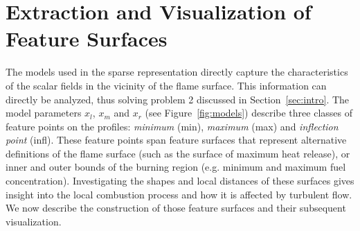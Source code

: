
%
\section{Extraction and Visualization of Feature Surfaces}
\label{sec:visualization}
%
The models used in the sparse representation directly capture the
characteristics of the scalar fields in the vicinity of the flame surface. This
information can directly be analyzed, thus solving problem 2 discussed in
Section~\ref{sec:intro}. The model parameters $x_l$, $x_m$ and $x_r$ (see
Figure~\ref{fig:models}) describe three classes of feature points on the
profiles: \emph{minimum} (min), \emph{maximum} (max) and \emph{inflection point}
(infl).
%
% 
These feature points span feature surfaces that represent alternative
definitions of the flame surface (such as the surface of maximum heat release),
or inner and outer bounds of the burning region (e.g. minimum and maximum fuel
concentration). Investigating the shapes and local distances of these surfaces
gives insight into the local combustion process and how it is affected
by turbulent flow. We now describe the construction of those feature surfaces
and their subsequent visualization.
%
%
%
%
